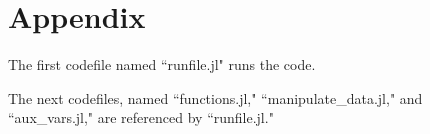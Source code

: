 \documentclass[landscape]{article} %
\theoremstyle{definition}
\begin{document}
\newpage
\section*{Appendix}
 	The first codefile named ``runfile.jl" runs the code.
	
 	The next codefiles, named ``functions.jl," ``manipulate\_data.jl," and ``aux\_vars.jl," are referenced by ``runfile.jl."

\end{document}

